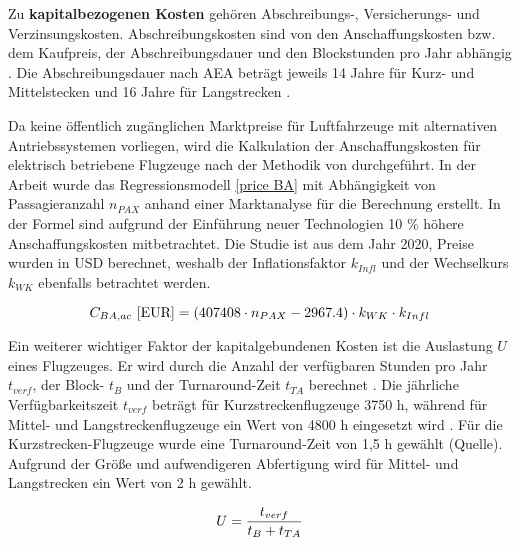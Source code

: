 Zu \textbf{kapitalbezogenen Kosten} gehören Abschreibungs-, Versicherungs- und Verzinsungskosten. 
Abschreibungskosten sind von den Anschaffungskosten bzw. dem Kaufpreis, 
der Abschreibungsdauer und den Blockstunden pro Jahr abhängig \cite{conrady2019luftverkehr}.
Die Abschreibungsdauer nach AEA beträgt jeweils 14 Jahre für 
Kurz- und Mittelstecken und 16 Jahre für Langstrecken \cite{scholz_design_evaluation_doc}.

Da keine öffentlich zugänglichen Marktpreise für Luftfahrzeuge mit alternativen Antriebssystemen vorliegen, 
wird die Kalkulation der Anschaffungskosten für elektrisch betriebene Flugzeuge 
nach der Methodik von \cite{monjon2020conceptual} durchgeführt. 
In der Arbeit wurde das Regressionsmodell \eqref{price BA} mit Abhängigkeit von Passagieranzahl $n_{PAX}$ 
anhand einer Marktanalyse für die Berechnung erstellt. 
%
In der Formel sind aufgrund der Einführung neuer Technologien 10 \% höhere Anschaffungskosten mitbetrachtet. 
Die Studie ist aus dem Jahr 2020, Preise wurden in USD berechnet, 
weshalb der Inflationsfaktor $k_{Infl}$ und der Wechselkurs $k_{WK}$ 
ebenfalls betrachtet werden.

\begin{equation}
   {C_{BA,ac} ~[\text{EUR}]} = (407408 \cdot n_{PAX} - 2967.4) \cdot k_{WK} \cdot {k_{Infl}}\\
   \label{price BA}
\end{equation}

Ein weiterer wichtiger Faktor der kapitalgebundenen Kosten ist die Auslastung $U$ eines Flugzeuges. 
Er wird durch die Anzahl der verfügbaren Stunden pro Jahr $t_{verf}$, 
der Block- $t_B$ und der Turnaround-Zeit $t_{TA}$ berechnet \cite{minwoo2019analysis}. 
Die jährliche Verfügbarkeitszeit $t_{verf}$ beträgt für Kurzstreckenflugzeuge 3750 h, 
während für Mittel- und Langstreckenflugzeuge ein Wert von 4800 h eingesetzt wird \cite{scholz_design_evaluation_doc}. 
Für die Kurzstrecken-Flugzeuge wurde eine Turnaround-Zeit von 1,5 h gewählt (Quelle).
Aufgrund der Größe und aufwendigeren Abfertigung wird für Mittel- und Langstrecken ein Wert von 2 h gewählt.

\begin{equation}
   U = \frac{t_{verf}}{t_B + t_{TA}} \\
   \label{utilisation}
\end{equation}
 
